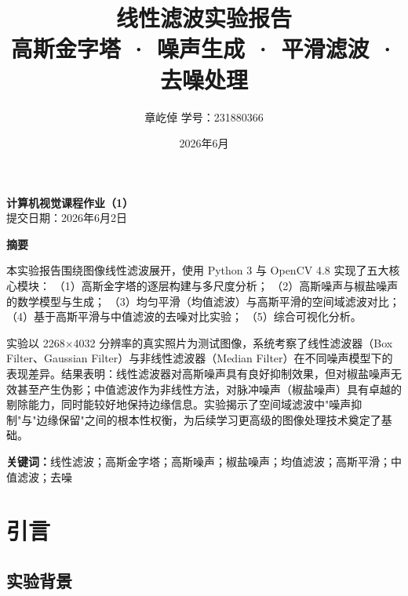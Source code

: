 \documentclass[12pt,a4paper]{ctexart}
\title{\vspace{2cm}\Huge\textbf{线性滤波实验报告}\\[0.5cm]
       \Large 高斯金字塔 · 噪声生成 · 平滑滤波 · 去噪处理}
\author{\large 章屹倬 \quad 学号：231880366}
\date{\large 2026年6月}
\begin{document}
\maketitle
\thispagestyle{empty}

\vspace{2cm}
\begin{center}
    \large\textbf{计算机视觉课程作业（1）}\\[0.5cm]
    \normalsize 提交日期：2026年6月2日
\end{center}

\newpage

\thispagestyle{empty}
\begin{center}
    \Large\textbf{摘\quad 要}
\end{center}
\vspace{1cm}

本实验报告围绕图像线性滤波展开，使用 Python 3 与 OpenCV 4.8 实现了五大核心模块：
（1）高斯金字塔的逐层构建与多尺度分析；
（2）高斯噪声与椒盐噪声的数学模型与生成；
（3）均匀平滑（均值滤波）与高斯平滑的空间域滤波对比；
（4）基于高斯平滑与中值滤波的去噪对比实验；
（5）综合可视化分析。

实验以 2268$\times$4032 分辨率的真实照片为测试图像，系统考察了线性滤波器（Box Filter、Gaussian Filter）与非线性滤波器（Median Filter）在不同噪声模型下的表现差异。结果表明：线性滤波器对高斯噪声具有良好抑制效果，但对椒盐噪声无效甚至产生伪影；中值滤波作为非线性方法，对脉冲噪声（椒盐噪声）具有卓越的剔除能力，同时能较好地保持边缘信息。实验揭示了空间域滤波中"噪声抑制"与"边缘保留"之间的根本性权衡，为后续学习更高级的图像处理技术奠定了基础。

\vspace{1cm}
\noindent\textbf{关键词：}线性滤波；高斯金字塔；高斯噪声；椒盐噪声；均值滤波；高斯平滑；中值滤波；去噪

\newpage

\tableofcontents
\newpage

\section{引言}

\subsection{实验背景}
\end{document}
